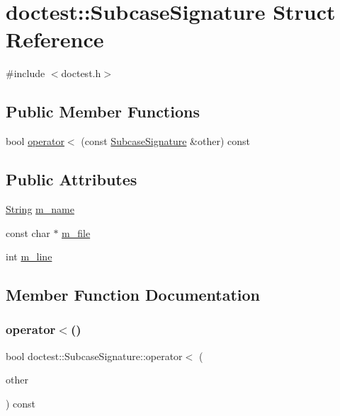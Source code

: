 \hypertarget{structdoctest_1_1_subcase_signature}{}\section{doctest\+:\+:Subcase\+Signature Struct Reference}
\label{structdoctest_1_1_subcase_signature}


{\ttfamily \#include $<$doctest.\+h$>$}

\subsection*{Public Member Functions}
\begin{DoxyCompactItemize}
\item 
bool \mbox{\hyperlink{structdoctest_1_1_subcase_signature_a07364f9dddf615f51e15f09b994d4bef}{operator$<$}} (const \mbox{\hyperlink{structdoctest_1_1_subcase_signature}{Subcase\+Signature}} \&other) const
\end{DoxyCompactItemize}
\subsection*{Public Attributes}
\begin{DoxyCompactItemize}
\item 
\mbox{\hyperlink{classdoctest_1_1_string}{String}} \mbox{\hyperlink{structdoctest_1_1_subcase_signature_a61081d1b920e862241e6f81731fb8a58}{m\+\_\+name}}
\item 
const char $\ast$ \mbox{\hyperlink{structdoctest_1_1_subcase_signature_adc680b4597c89fb81ae8fed7fc41414d}{m\+\_\+file}}
\item 
int \mbox{\hyperlink{structdoctest_1_1_subcase_signature_a73fb5432d0f8b82ffbe262b86af5c643}{m\+\_\+line}}
\end{DoxyCompactItemize}


\subsection{Member Function Documentation}
\mbox{\label{structdoctest_1_1_subcase_signature_a07364f9dddf615f51e15f09b994d4bef}} 
\subsubsection{\texorpdfstring{operator$<$()}{operator<()}}
{\footnotesize\ttfamily bool doctest\+::\+Subcase\+Signature\+::operator$<$ (\begin{DoxyParamCaption}\item[{const \mbox{\hyperlink{structdoctest_1_1_subcase_signature}{Subcase\+Signature}} \&}]{other }\end{DoxyParamCaption}) const}



